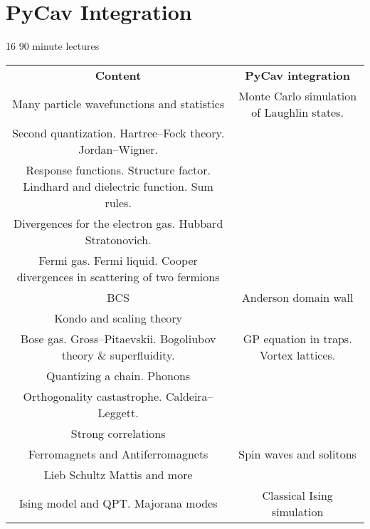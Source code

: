 \section{PyCav Integration}

16 90 minute lectures

\begin{table} 
    \begin{tabular}{ c | c }
     \textbf{Content}   & \textbf{PyCav integration}  \\ 
       Many particle wavefunctions and statistics 
   & Monte Carlo simulation of Laughlin states. \\ 
      Second quantization. Hartree--Fock theory. Jordan--Wigner.  &  \\ 
      Response functions. Structure factor. Lindhard and dielectric function. Sum rules.     &  \\ 
        Divergences for the electron gas. Hubbard Stratonovich. & \\
      Fermi gas. Fermi liquid. Cooper divergences in scattering of two fermions  &  \\ 
      BCS   & Anderson domain wall  \\ 
      Kondo and scaling theory   &  \\ 
      Bose gas. Gross--Pitaevskii. Bogoliubov theory \& superfluidity.   & GP equation in traps. Vortex lattices. \\ 
      Quantizing a chain. Phonons   &  \\ 
      Orthogonality castastrophe. Caldeira--Leggett.   &  \\ 
      Strong correlations   &  \\ 
      Ferromagnets and Antiferromagnets   & Spin waves and solitons \\ 
      Lieb Schultz Mattis and more \\
    Ising model and QPT. Majorana modes   &  Classical Ising simulation \\ 


    \end{tabular} 
\end{table}


